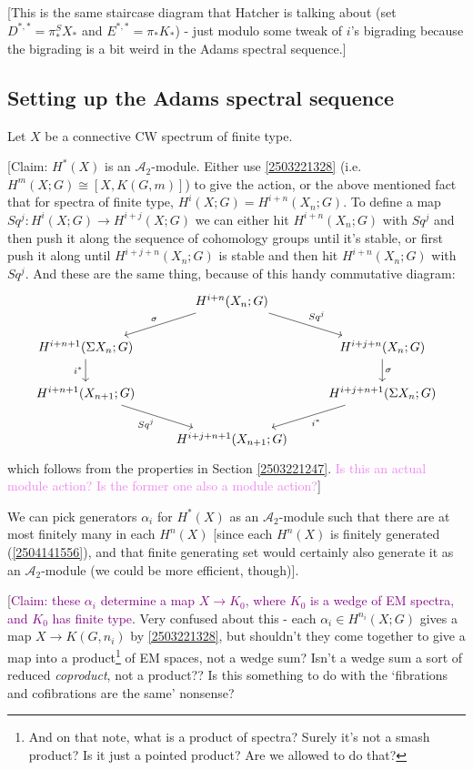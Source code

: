 \documentclass{MetricNotes2023}
\def\A{\ensuremath{\mathscr{A}_2}}
\def\textcolour{\textcolor}
\begin{document}
[This is the same staircase diagram that Hatcher is talking about (set \(D^{*,*}=\pi_*^SX_*\) and \(E^{*,*}=\pi_*K_*\)) - just modulo some tweak of \(i\)'s bigrading because the bigrading is a bit weird in the Adams spectral sequence.]

\subsection{Setting up the Adams spectral sequence}

Let \(X\) be a connective CW spectrum of finite type.

[Claim: \(H^*(X)\) is an \(\mathscr{A}_2\)-module. Either use \ref{2503221328} (i.e. \(H^m(X;G)\cong[X,K(G,m)]\)) to give the action, or the above mentioned fact that for spectra of finite type, \(H^i(X; G)=H^{i+n}(X_n;G)\). To define a map \(Sq^j : H^{i}(X;G)\to H^{i+j}(X;G)\) we can either hit \(H^{i+n}(X_n;G)\) with \(Sq^j\) and then push it along the sequence of cohomology groups until it's stable, or first push it along until \(H^{i+j+n}(X_n;G)\) is stable and then hit \(H^{i+n}(X_n;G)\) with \(Sq^j\). And these are the same thing, because of this handy commutative diagram:
\[\begin{tikzcd} 
 & H^{i+n}(X_n;G)  \arrow[dl, "\sigma"'] \arrow[dr, "Sq^j"] & \\ 
 H^{i+n+1}(\Sigma X_n;G) \arrow[d, "i^*"'] & & H^{i+j+n}(X_n;G) \arrow[d, "\sigma"] \\ 
 H^{i+n+1}(X_{n+1};G) \arrow[dr, "Sq^j"'] & & H^{i+j+n+1}(\Sigma X_n;G) \arrow[dl, "i^*"] \\ 
 & H^{i+j+n+1}(X_{n+1};G) &  
\end{tikzcd}\] 
which follows from the properties in Section  \ref{2503221247}. \textcolour{violet}{Is this an actual module action? Is the former one also a module action?}]

We can pick generators \(\alpha_i\) for \(H^*(X)\) as an \(\mathscr{A}_2\)-module such that there are at most finitely many in each \(H^n(X)\) [since each \(H^n(X)\) is finitely generated (\ref{2504141556}), and that finite generating set would certainly also generate it as an \(\A\)-module (we could be more efficient, though)].

[\textcolour{purple}{Claim: these \(\alpha_i\) determine a map \(X \to K_0\), where \(K_0\) is a wedge of EM spectra, and \(K_0\) has finite type}. Very confused about this - each \(\alpha_i\in H^{n_i}(X;G)\) gives a map \(X \to K(G,n_i)\) by \ref{2503221328}, but shouldn't they  come together to give a map into a product\footnote{And on that note, what is a product of spectra? Surely it's not a smash product? Is it just a pointed product? Are we allowed to do that?} of EM spaces, not a wedge sum? Isn't a wedge sum a sort of reduced \textit{coproduct}, not a product?? Is this something to do with the `fibrations and cofibrations are the same' nonsense?
\end{document}
